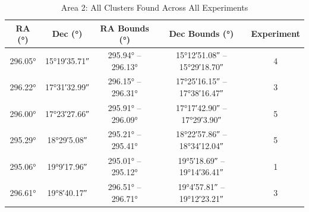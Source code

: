 \begin{table}[H]
    \centering
    \caption{\label{tb:results-raw-a2}Area 2: All Clusters Found Across All Experiments}

    \begin{tabular}{c c c c c }
        \toprule
        RA (°)                                 & Dec (°)                                      & RA Bounds (°)                                                                    & Dec Bounds (°)                                                                               & Experiment \\
        \midrule
        \ang[minimum-integer-digits=2]{296.05} & \ang[minimum-integer-digits=2]{+15;19;35.71} & \ang[minimum-integer-digits=2]{295.94} -- \ang[minimum-integer-digits=2]{296.13} & \ang[minimum-integer-digits=2]{+15;12;51.08} -- \ang[minimum-integer-digits=2]{+15;29;18.70} & 4          \\ %
        \ang[minimum-integer-digits=2]{296.22} & \ang[minimum-integer-digits=2]{+17;31;32.99} & \ang[minimum-integer-digits=2]{296.15} -- \ang[minimum-integer-digits=2]{296.31} & \ang[minimum-integer-digits=2]{+17;25;16.15} -- \ang[minimum-integer-digits=2]{+17;38;16.47} & 3          \\ %
        \ang[minimum-integer-digits=2]{296.00} & \ang[minimum-integer-digits=2]{+17;23;27.66} & \ang[minimum-integer-digits=2]{295.91} -- \ang[minimum-integer-digits=2]{296.09} & \ang[minimum-integer-digits=2]{+17;17;42.90} -- \ang[minimum-integer-digits=2]{+17;29;3.90}  & 5          \\ %
        \ang[minimum-integer-digits=2]{295.29} & \ang[minimum-integer-digits=2]{+18;29;5.08}  & \ang[minimum-integer-digits=2]{295.21} -- \ang[minimum-integer-digits=2]{295.41} & \ang[minimum-integer-digits=2]{+18;22;57.86} -- \ang[minimum-integer-digits=2]{+18;34;12.04} & 5          \\ %
        \ang[minimum-integer-digits=2]{295.06} & \ang[minimum-integer-digits=2]{+19;9;17.96}  & \ang[minimum-integer-digits=2]{295.01} -- \ang[minimum-integer-digits=2]{295.12} & \ang[minimum-integer-digits=2]{+19;5;18.69} -- \ang[minimum-integer-digits=2]{+19;14;36.41}  & 1          \\ %
        \ang[minimum-integer-digits=2]{296.61} & \ang[minimum-integer-digits=2]{+19;8;40.17}  & \ang[minimum-integer-digits=2]{296.51} -- \ang[minimum-integer-digits=2]{296.71} & \ang[minimum-integer-digits=2]{+19;4;57.81} -- \ang[minimum-integer-digits=2]{+19;12;23.21}  & 3          \\ %

\end{tabular}
\end{table}
